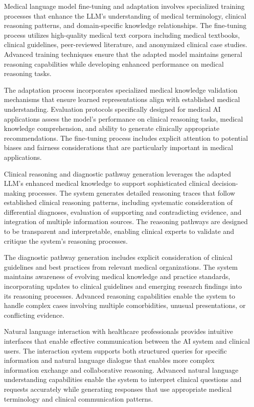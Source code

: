 Medical language model fine-tuning and adaptation involves specialized training processes that enhance the LLM's understanding of medical terminology, clinical reasoning patterns, and domain-specific knowledge relationships. The fine-tuning process utilizes high-quality medical text corpora including medical textbooks, clinical guidelines, peer-reviewed literature, and anonymized clinical case studies. Advanced training techniques ensure that the adapted model maintains general reasoning capabilities while developing enhanced performance on medical reasoning tasks.

The adaptation process incorporates specialized medical knowledge validation mechanisms that ensure learned representations align with established medical understanding. Evaluation protocols specifically designed for medical AI applications assess the model's performance on clinical reasoning tasks, medical knowledge comprehension, and ability to generate clinically appropriate recommendations. The fine-tuning process includes explicit attention to potential biases and fairness considerations that are particularly important in medical applications.

Clinical reasoning and diagnostic pathway generation leverages the adapted LLM's enhanced medical knowledge to support sophisticated clinical decision-making processes. The system generates detailed reasoning traces that follow established clinical reasoning patterns, including systematic consideration of differential diagnoses, evaluation of supporting and contradicting evidence, and integration of multiple information sources. The reasoning pathways are designed to be transparent and interpretable, enabling clinical experts to validate and critique the system's reasoning processes.

The diagnostic pathway generation includes explicit consideration of clinical guidelines and best practices from relevant medical organizations. The system maintains awareness of evolving medical knowledge and practice standards, incorporating updates to clinical guidelines and emerging research findings into its reasoning processes. Advanced reasoning capabilities enable the system to handle complex cases involving multiple comorbidities, unusual presentations, or conflicting evidence.

Natural language interaction with healthcare professionals provides intuitive interfaces that enable effective communication between the AI system and clinical users. The interaction system supports both structured queries for specific information and natural language dialogue that enables more complex information exchange and collaborative reasoning. Advanced natural language understanding capabilities enable the system to interpret clinical questions and requests accurately while generating responses that use appropriate medical terminology and clinical communication patterns.

